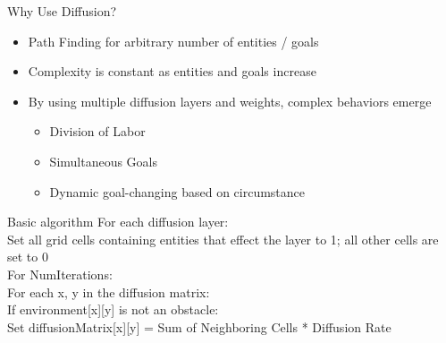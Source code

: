 \documentclass{beamer}
\begin{document}
\begin{frame}{Why Use Diffusion?}
  \begin{itemize}
  \item Path Finding for arbitrary number of entities / goals
  \item Complexity is constant as entities and goals increase
  \item By using multiple diffusion layers and weights, complex behaviors emerge
    \begin{itemize}
    \item Division of Labor
    \item Simultaneous Goals
    \item Dynamic goal-changing based on circumstance
    \end{itemize}
  \end{itemize}
\end{frame}
\begin{frame}{Basic algorithm}
 For each diffusion layer:\\
Set all grid cells containing entities that effect the layer to 1; all other cells are set to 0\\
     For NumIterations:\\
         For each x, y in the diffusion matrix:\\
             If environment[x][y] is not an obstacle:\\
                 Set diffusionMatrix[x][y] = Sum of Neighboring Cells * Diffusion Rate\\
\end{frame}
\end{document}
